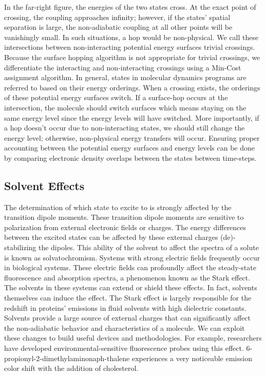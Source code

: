 In the far-right figure, the energies of the two states cross.
At the exact point of crossing, the coupling approaches infinity; however, if the states' spatial separation is large, the non-adiabatic coupling at all other points will be vanishingly small. In such situations, a hop would be non-physical. We call these intersections between non-interacting potential energy surfaces trivial crossings. Because the surface hopping algorithm is not appropriate for trivial crossings, we differentiate the interacting and non-interacting crossings using a Min-Cost assignment algorithm. \cite{fernandez2012identification} 
In general, states in molecular dynamics programs are referred to based on their energy orderings. When a crossing exists, the orderings of these potential energy surfaces switch. If a surface-hop occurs at the intersection, the molecule should switch surfaces which means staying on the same energy level since the energy levels will have switched. More importantly, if a hop doesn't occur due to non-interacting states, we should still change the energy level; otherwise, non-physical energy transfers will occur. Ensuring proper accounting between the potential energy surfaces and energy levels can be done by comparing electronic density overlaps between the states between time-steps.

\subsection{Solvent Effects}
The determination of which state to excite to is strongly affected by the transition dipole moments. These transition dipole moments are sensitive to polarization from external electronic fields or charges. The energy differences between the excited states can be affected by these external charges (de)-stabilizing the dipoles.
This ability of the solvent to affect the spectra of a solute is known as solvatochromism. \cite{marini2010solvatochromism} Systems with strong electric fields frequently occur in biological systems.\cite{park1999vibrational,kriegl2003ligand} 
These electric fields can profoundly affect the steady-state fluorescence and absorption spectra, a phenomenon known as the Stark effect. \cite{Park2013} The solvents in these systems can extend or shield these effects. In fact, solvents themselves can induce the effect. The Stark effect is largely responsible for the redshift in proteins' emissions in fluid solvents with high dielectric constants.\cite{callis1997tryptophan,park1999vibrational} Solvents provide a large source of external charges that can significantly affect the non-adiabatic behavior and characteristics of a molecule.\cite{furukawa2015external} We can exploit these changes to build useful devices and methodologies. For example, researchers have developed environmental-sensitive fluorescence probes using this effect. \cite{klymchenko2004bimodal} 6-propionyl-2-dimethylaminonaph-thalene experiences a very noticeable emission color shift with the addition of cholesterol.\cite{massey1998effect,bondar1999preferential}

